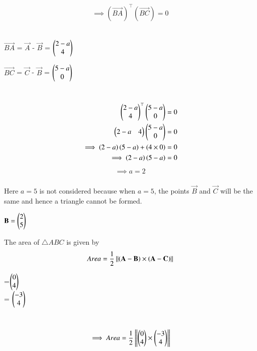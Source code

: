 \documentclass[journal]{IEEEtran}
\begin{document}
\begin{align}
\implies {(\vec{BA})^{\top}}{(\vec{BC})} = 0
\end{align}\\
\begin{center}
$\vec{BA}$ = $\vec{A}$ - $\vec{B}$ = $\begin{pmatrix}2-a\\4\end{pmatrix}$
\end{center}
\begin{center}
$\vec{BC}$ = $\vec{C}$ - $\vec{B}$ = $\begin{pmatrix}5-a\\0\end{pmatrix}$
\end{center}\\
\begin{align}
    \begin{pmatrix}2-a\\4\end{pmatrix}^{\top}\begin{pmatrix}5-a\\0\end{pmatrix} = 0\\
    \begin{pmatrix}2-a & 4\end{pmatrix}\begin{pmatrix}5-a\\0\end{pmatrix} = 0\\
    \implies \left(2-a\right)\left(5-a\right) + \left(4\times0\right) = 0\\
    \implies \left(2-a\right)\left(5-a\right) = 0
\end{align}
\begin{align}
    \implies a = 2
\end{align}
\\
Here $a = 5$ is not considered because when $a = 5$, the points $\vec{B}$ and $\vec{C}$ will be the same and hence a triangle cannot be formed.\\
\begin{center}
$\vec{B}=\begin{myvec}{2\\5}\end{myvec}$
\end{center}
The area of $\triangle ABC$ is given by
		\begin{align}
			Area = \frac{1}{2}\left\lVert{\ensuremath{\left(\mathbf{A}-\mathbf{B}\right)}\times \ensuremath{\left(\mathbf{A}-\mathbf{C}\right)}}\right\rVert
		\end{align}
\begin{center}
     =$\begin{pmatrix}0\\4\end{pmatrix}$\\
     = $\begin{pmatrix}-3\\4\end{pmatrix}$
\end{center}
\\
\begin{align}
\implies Area = \frac{1}{2}\left\lVert\begin{pmatrix}0\\4\end{pmatrix}\times \begin{pmatrix}-3\\4\end{pmatrix}\right\rVert
\end{align}
\end{document}
